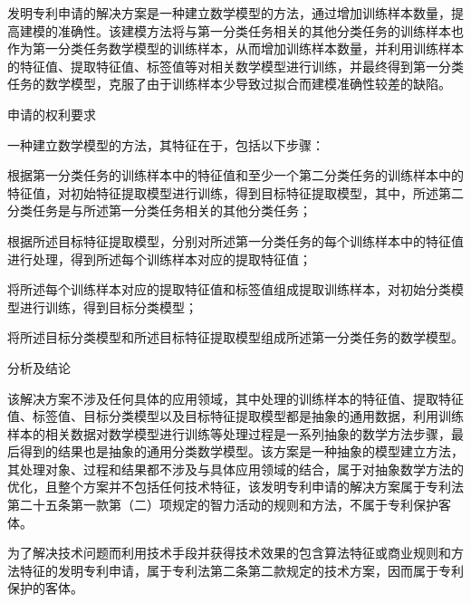 {\setlength{\parindent}{20.6bp}发明专利申请的解决方案是一种建立数学模型的方法，通过增加训练样本数量，提高建模的准确性。该建模方法将与第一分类任务相关的其他分类任务的训练样本也作为第一分类任务数学模型的训练样本，从而增加训练样本数量，并利用训练样本的特征值、提取特征值、标签值等对相关数学模型进行训练，并最终得到第一分类任务的数学模型，克服了由于训练样本少导致过拟合而建模准确性较差的缺陷。\par}

{\setlength{\parindent}{20.1bp}申请的权利要求\par}

{\setlength{\parindent}{20.6bp}一种建立数学模型的方法，其特征在于，包括以下步骤：\par}

{\setlength{\parindent}{20.6bp}根据第一分类任务的训练样本中的特征值和至少一个第二分类任务的训练样本中的特征值，对初始特征提取模型进行训练，得到目标特征提取模型，其中，所述第二分类任务是与所述第一分类任务相关的其他分类任务；\par}

{\setlength{\parindent}{20.6bp}根据所述目标特征提取模型，分别对所述第一分类任务的每个训练样本中的特征值进行处理，得到所述每个训练样本对应的提取特征值；\par}

{\setlength{\parindent}{20.6bp}将所述每个训练样本对应的提取特征值和标签值组成提取训练样本，对初始分类模型进行训练，得到目标分类模型；\par}

{\setlength{\parindent}{20.6bp}将所述目标分类模型和所述目标特征提取模型组成所述第一分类任务的数学模型。\par}

{\setlength{\parindent}{20.1bp}分析及结论\par}

{\setlength{\parindent}{20.6bp}该解决方案不涉及任何具体的应用领域，其中处理的训练样本的特征值、提取特征值、标签值、目标分类模型以及目标特征提取模型都是抽象的通用数据，利用训练样本的相关数据对数学模型进行训练等处理过程是一系列抽象的数学方法步骤，最后得到的结果也是抽象的通用分类数学模型。该方案是一种抽象的模型建立方法，其处理对象、过程和结果都不涉及与具体应用领域的结合，属于对抽象数学方法的优化，且整个方案并不包括任何技术特征，该发明专利申请的解决方案属于专利法第二十五条第一款第（二）项规定的智力活动的规则和方法，不属于专利保护客体。\par}

{\setlength{\parindent}{15.3bp}为了解决技术问题而利用技术手段并获得技术效果的包含算法特征或商业规则和方法特征的发明专利申请，属于专利法第二条第二款规定的技术方案，因而属于专利保护的客体。\par}

